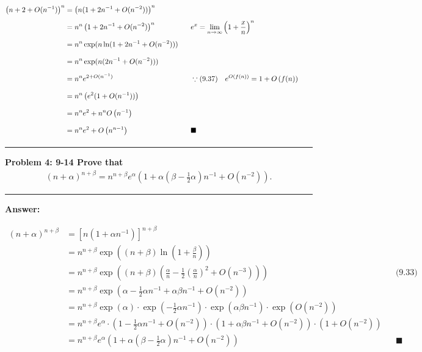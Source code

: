 \documentclass[11pt,fleqn]{article}
\newcommand\question[2]{\vspace{.25in}\hrule\textbf{#1: #2}\vspace{.5em}\hrule\vspace{.10in}}
\renewcommand\part[1]{\vspace{.10in}\textbf{#1}}
\begin{document}
\begin{align*}
	\left(n + 2 + O(n^{-1})\right)^n 
		&= \left(n(1 + 2n^{-1} + O(n^{-2}))\right)^n \phantom{1\over1}\\
		&= n^n \left(1 + 2n^{-1} + O(n^{-2})\right)^n 
			&& e^x = \lim_{n \rightarrow \infty} \left(1 + \frac{x}{n}\right)^n 
			\phantom{1\over1} \\
		&= n^n \exp(n \ln (1 + 2n^{-1} + O(n^{-2}))) \phantom{1\over1} \\
		&= n^n \exp(n (2n^{-1} + O(n^{-2}))) \phantom{1\over1} \\
		&= n^n e^{2 + O(n^{-1})} 
			&& \because \text{(9.37)} \quad e^{O\left(f(n)\right)} = 1 + O\left(f(n)\right)
			\phantom{1\over1} \\
		&= n^n \left(e^2 (1 + O(n^{-1}))\right) \phantom{1\over1} \\
		&= n^n e^2 + n^n O\left(n^{-1}\right) \phantom{1\over1} \\
		&= n^n e^2 + O\left(n^{n-1}\right) \phantom{1\over1}
			&& \blacksquare
\end{align*}

\question{Problem 4} {9-14 Prove that
	\begin{align*}
		(n+\alpha)^{n+\beta} 
			= n^{n+\beta} e^{\alpha}\left(1 + \alpha(\beta-\frac{1}{2}\alpha)n^{-1} 
				+ O(n^{-2}) \right).
	\end{align*}
}

\part{Answer:}

\begin{align*}
	(n+\alpha)^{n+\beta} &= \left[n(1+\alpha n^{-1})\right]^{n+\beta} \\
		&= n^{n+\beta} \exp((n+\beta) \ln(1+\frac{\beta}{n})) \\
		&= n^{n+\beta} \exp((n+\beta) (\frac{\alpha}{n} 
			- \frac{1}{2} \left(\frac{\alpha}{n}\right)^2 + O(n^{-3}))) 
			&& \text{(9.33)}\\
		&= n^{n+\beta} \exp(\alpha-\frac{1}{2}\alpha n^{-1} 
			+ \alpha\beta n^{-1} + O(n^{-2})) \\
		&= n^{n+\beta} \exp(\alpha) \cdot \exp(-\frac{1}{2}\alpha n^{-1}) 
			\cdot \exp(\alpha\beta n^{-1}) \cdot \exp(O(n^{-2})) \\
		&= n^{n+\beta} e^{\alpha} \cdot
			\left(1 - \frac{1}{2}\alpha n^{-1} + O(n^{-2})\right) \cdot
			\left(1 + \alpha\beta n^{-1} + O(n^{-2})\right) \cdot
			\left(1 + O(n^{-2})\right) \\
		&= n^{n+\beta} e^{\alpha} \left(1 + \alpha(\beta-\frac{1}{2}\alpha)n^{-1} 
				+ O(n^{-2}) \right) && \blacksquare
\end{align*}
\end{document}
